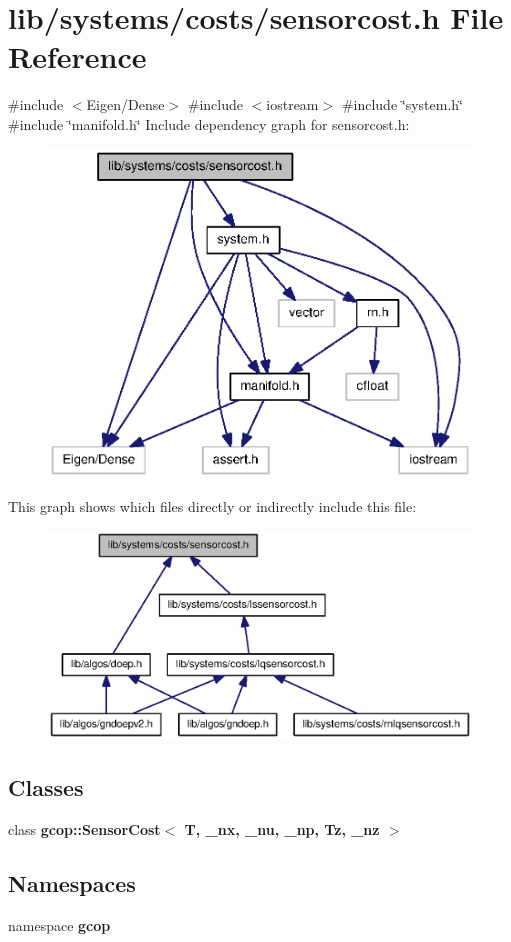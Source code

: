 \section{lib/systems/costs/sensorcost.h \-File \-Reference}
\label{sensorcost_8h}
{\ttfamily \#include $<$\-Eigen/\-Dense$>$}\*
{\ttfamily \#include $<$iostream$>$}\*
{\ttfamily \#include \char`\"{}system.\-h\char`\"{}}\*
{\ttfamily \#include \char`\"{}manifold.\-h\char`\"{}}\*
\-Include dependency graph for sensorcost.\-h\-:\nopagebreak
\begin{figure}[H]
\begin{center}
\leavevmode
\includegraphics[width=350pt]{sensorcost_8h__incl}
\end{center}
\end{figure}
\-This graph shows which files directly or indirectly include this file\-:\nopagebreak
\begin{figure}[H]
\begin{center}
\leavevmode
\includegraphics[width=350pt]{sensorcost_8h__dep__incl}
\end{center}
\end{figure}
\subsection*{\-Classes}
\begin{DoxyCompactItemize}
\item 
class {\bf gcop\-::\-Sensor\-Cost$<$ T, \-\_\-nx, \-\_\-nu, \-\_\-np, Tz, \-\_\-nz $>$}
\end{DoxyCompactItemize}
\subsection*{\-Namespaces}
\begin{DoxyCompactItemize}
\item 
namespace {\bf gcop}
\end{DoxyCompactItemize}
